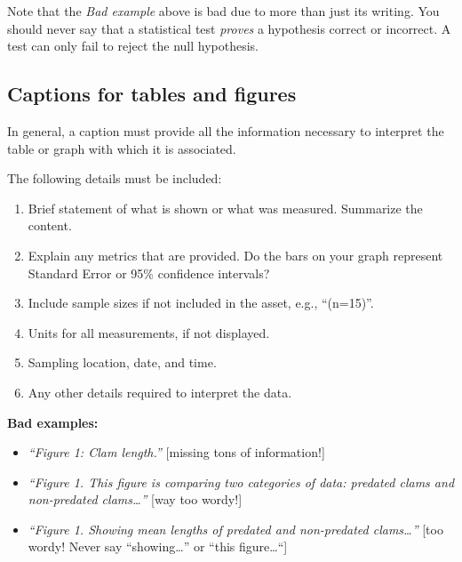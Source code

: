 \documentclass[
]{book}
\providecommand{\tightlist}{%
  \setlength{\itemsep}{0pt}\setlength{\parskip}{0pt}}
\begin{document}
Note that the \emph{Bad example} above is bad due to more than just its writing. You should never say that a statistical test \emph{proves} a hypothesis correct or incorrect. A test can only fail to reject the null hypothesis.

\hypertarget{captions-for-tables-and-figures}{%
\subsection*{Captions for tables and figures}\label{captions-for-tables-and-figures}}

In general, a caption must provide all the information necessary to interpret the table or graph with which it is associated.

The following details must be included:

\begin{enumerate}
\def\labelenumi{\arabic{enumi}.}
\tightlist
\item
  Brief statement of what is shown or what was measured. Summarize the content.
\item
  Explain any metrics that are provided. Do the bars on your graph represent Standard Error or 95\% confidence intervals?
\item
  Include sample sizes if not included in the asset, e.g., ``(n=15)''.
\item
  Units for all measurements, if not displayed.\\
\item
  Sampling location, date, and time.\\
\item
  Any other details required to interpret the data.
\end{enumerate}

\textbf{Bad examples:}

\begin{itemize}
\tightlist
\item
  \emph{``Figure 1: Clam length.''} {[}missing tons of information!{]}\\
\item
  \emph{``Figure 1. This figure is comparing two categories of data: predated clams and non-predated clams\ldots{}''} {[}way too wordy!{]}
\item
  \emph{``Figure 1. Showing mean lengths of predated and non-predated clams\ldots{}''} {[}too wordy! Never say ``showing\ldots{}'' or ``this figure\ldots``{]}
\end{itemize}
\end{document}
